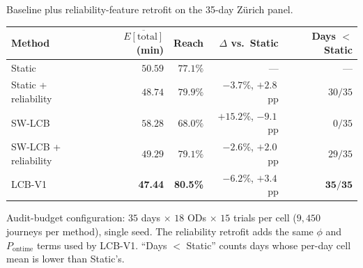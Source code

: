 \documentclass[opre,dblanonrev]{informs4}
\begin{document}
\begin{table}
\TABLE
{Baseline plus reliability-feature retrofit on the 35-day Z\"urich panel.\label{tab:baseline_a7_audit}}
{\scriptsize\begin{tabular}{lrrrr}
\toprule
Method & $\overline{E[\mathrm{total}]}$ (min) & Reach & $\Delta$ vs.\ Static & Days $<$~Static \\
\midrule
Static          & $50.59$ & $77.1\%$ & --- & --- \\
Static + reliability     & $48.74$ & $79.9\%$ & $-3.7\%$, $+2.8$\,pp & $30/35$ \\
SW-LCB          & $58.28$ & $68.0\%$ & $+15.2\%$, $-9.1$\,pp & $0/35$ \\
SW-LCB + reliability     & $49.29$ & $79.1\%$ & $-2.6\%$, $+2.0$\,pp & $29/35$ \\
LCB-V1          & \textbf{47.44} & \textbf{80.5\%} & $-6.2\%$, $+3.4$\,pp & $\mathbf{35/35}$ \\
\bottomrule
\end{tabular}}
{Audit-budget configuration: $35$ days $\times$ $18$ ODs
$\times$ $15$ trials per cell ($9{,}450$ journeys per method), single
seed. The reliability retrofit adds the same $\phi$ and
$P_{\mathrm{ontime}}$ terms used by LCB-V1. ``Days $<$ Static''
counts days whose per-day cell mean is lower than Static's.}
\end{table}
\end{document}

